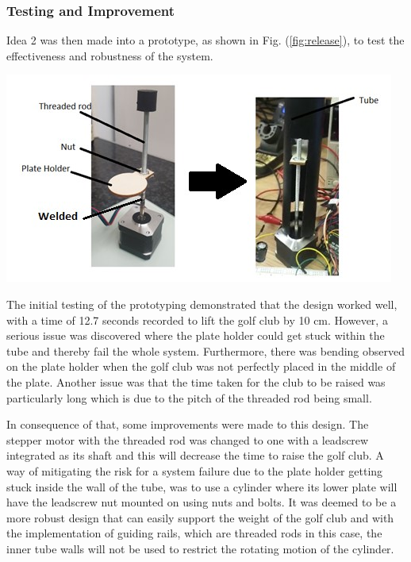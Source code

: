 \documentclass[11pt,landscape]{article}
\newenvironment{Figure}
  {\par\medskip\noindent\minipage{\linewidth}}
  {\endminipage\par\medskip}
\begin{document}
\begin{multicols}{2}
    
    \subsubsection{Testing and Improvement}
    Idea 2 was then made into a prototype, as shown in Fig. (\ref{fig:release}),
    to test the effectiveness and robustness of the system. 
    
    \begin{Figure}
        \begin{center}
            \includegraphics[width=\textwidth]{Figure20.jpg}
            \label{fig:release}
        \end{center}
    \end{Figure}
    
    The initial testing of the prototyping demonstrated that the design worked
    well, with a time of 12.7 seconds recorded to lift the golf club by 10 cm.
    However, a serious issue was discovered where the plate holder could get stuck
    within the tube and thereby fail the whole system. Furthermore, there was
    bending observed on the plate holder when the golf club was not perfectly
    placed in the middle of the plate. Another issue was that the time taken for
    the club to be raised was particularly long which is due to the pitch of the
    threaded rod being small. 
    
    In consequence of that, some improvements were
    made to this design. The stepper motor with the threaded rod was changed to
    one with a leadscrew integrated as its shaft and this will decrease the time
    to raise the golf club. A way of mitigating the risk for a system failure
    due to the plate holder getting stuck inside the wall of the tube, was to
    use a cylinder where its lower plate will have the leadscrew nut mounted on
    using nuts and bolts. It was deemed to be a more robust design that can
    easily support the weight of the golf club and with the implementation of
    guiding rails, which are threaded rods in this case, the inner tube walls
    will not be used to restrict the rotating motion of the cylinder. 
    

\end{multicols}
\end{document}
